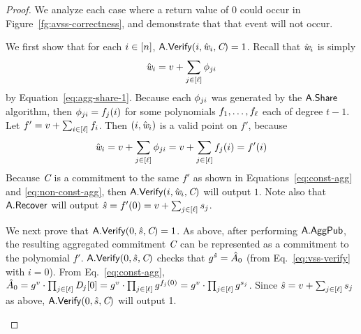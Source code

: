 \begin{proof}

We analyze each case where a return value of 0 could occur in Figure~\ref{fg:avss-correctness}, and demonstrate that that event will not occur.

\medskip

\setcounter{case}{0}

\begin{case} \label{case:corr-verify}
We first show that for each $i \in [n]$, $\mathsf{A}.\mathsf{Verify}(i, \hat{\textit{w}}_i, \textit{C}) = 1$.
Recall that $\hat{\textit{w}}_i$ is simply
  \[ \hat{\textit{w}}_i = v + \sum_{j \in [\mathsf{\ell}]} \phi_{ji} \]
by Equation~\ref{eq:agg-share-1}.
Because each $\phi_{ji}$ was generated by the $\mathsf{A}.\mathsf{Share}$ algorithm, then $\phi_{ji} = f_j(i)$ for some polynomials $f_1,\dots,f_{\mathsf{\ell}}$ each of degree $t-1$.
Let $f' = v + \sum_{i \in [\mathsf{\ell}]} f_i$.
Then $(i,\hat{\textit{w}}_i)$ is a valid point on $f'$, because
  \[ \hat{\textit{w}}_i = v + \sum_{j \in [\mathsf{\ell}]} \phi_{ji} =  v + \sum_{j \in [\mathsf{\ell}]} f_j(i) = f'(i) \]
Because $\textit{C}$ is a commitment to the same $f'$ as shown in Equations~\ref{eq:const-agg} and \ref{eq:non-const-agg},
then $\mathsf{A}.\mathsf{Verify}(i, \hat{\textit{w}}_i, \textit{C})$ will output $1$.
Note also that $\mathsf{A}.\mathsf{Recover}$ will output $\hat{s} = f'(0) = v + \sum_{j \in [\mathsf{\ell}]} s_j$.
\end{case}

\medskip

\begin{case} \label{case:sk-verify}
We next prove that $\mathsf{A}.\mathsf{Verify}(0, \hat{s}, \textit{C}) = 1$.
As above,
after performing $\mathsf{A}.\mathsf{AggPub}$,
the resulting aggregated commitment $\textit{C}$ can be represented as a commitment to the polynomial $f'$.
$\mathsf{A}.\mathsf{Verify}(0, \hat{s}, \textit{C})$ checks that $g^{\hat{s}} = \hat{A}_0$ (from Eq.~\ref{eq:vss-verify} with $i=0$).
From Eq.~\ref{eq:const-agg}, $\hat{A}_0 = g^{v} \cdot \prod_{j \in [\mathsf{\ell}]} \textit{D}_j[0] = g^{v} \cdot \prod_{j \in [\mathsf{\ell}]} g^{f_j(0)} =  g^{v} \cdot \prod_{j \in [\mathsf{\ell}]} g^{s_j}$.
Since $\hat{s} = v + \sum_{j \in [\mathsf{\ell}]} s_j$ as above,
$\mathsf{A}.\mathsf{Verify}(0, \hat{s}, \textit{C})$ will output 1.


\end{case}
\end{proof}
